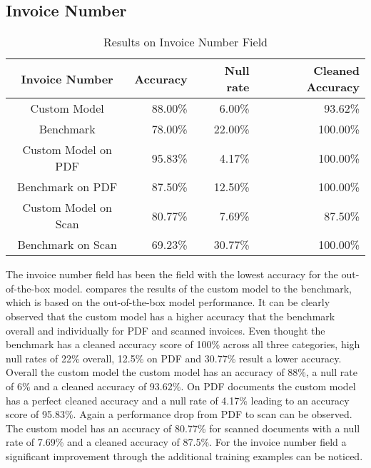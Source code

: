 \subsection*{Invoice Number}
\begin{table}[ht]   %
    \centering
    \footnotesize
    \begin{tabular}{c|rrr} %
        \toprule    %
        Invoice Number  & Accuracy  & Null rate & Cleaned Accuracy \\
        \midrule    %
        Custom Model               & 88.00\%   & 6.00\%   & 93.62\% \\
        Benchmark           & 78.00\%   & 22.00\%  & 100.00\%\\
        \midrule    %
        Custom Model on PDF        & 95.83\%   & 4.17\%  & 100.00\% \\
        Benchmark on PDF    & 87.50\%   & 12.50\%  & 100.00\% \\
        \midrule    %
        Custom Model on Scan       & 80.77\%  & 7.69\%   & 87.50\% \\
        Benchmark on Scan   & 69.23\%  & 30.77\%  & 100.00\% \\

        \bottomrule %
    \end{tabular}
    \caption{Results on Invoice Number Field}
    \label{table:Model_Bench_Number}
\end{table}

The invoice number field has been the field with the lowest accuracy for the out-of-the-box model. 
 compares the results of the custom model to the benchmark, which is based on the out-of-the-box model performance.
It can be clearly observed that the custom model has a higher accuracy that the benchmark overall and individually for PDF and scanned invoices. 
Even thought the benchmark has a cleaned accuracy score of 100\% across all three categories, high null rates of 22\% overall, 12.5\% on PDF and 30.77\% result a lower accuracy.
Overall the custom model the custom model has an accuracy of 88\%, a null rate of 6\% and a cleaned accuracy of 93.62\%. 
On PDF documents the custom model has a perfect cleaned accuracy and a null rate of 4.17\% leading to an accuracy score of 95.83\%.
Again a performance drop from PDF to scan can be observed. The custom model has an accuracy of 80.77\% for scanned documents with a null rate of 7.69\% and a cleaned accuracy of 87.5\%.
For the invoice number field a significant improvement through the additional training examples can be noticed.

